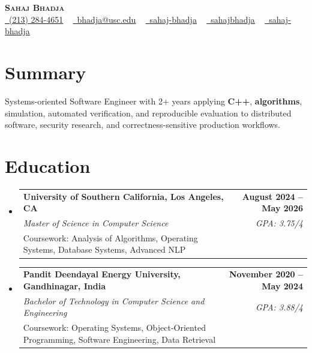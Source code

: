 \documentclass[letterpaper,10pt]{article}
\makeatletter
\newcommand{\sectionGap}{\vspace{-8pt}}
\newcommand{\resumeEduSubheading}[5]{\vspace{-1pt}\item\begin{tabular*}{1.0\textwidth}[t]{l@{\extracolsep{\fill}}r}\textbf{#1} & \textbf{\small #2} \\\textit{\small #3} & \textit{\small #4} \\\small #5 & \\\end{tabular*}\vspace{-4pt}}
\newcommand{\resumeSubHeadingListStart}{\begin{itemize}[leftmargin=0.0in, label={}]}
\newcommand{\resumeSubHeadingListEnd}{\end{itemize}}
\makeatother
\begin{document}
\begin{center}
{\Huge \scshape \textbf{Sahaj Bhadja}} \\ \vspace{1pt}
\small \href{tel:2132844651}{\faPhone\ \underline{(213) 284-4651}} ~ \href{mailto:bhadja@usc.edu}{\raisebox{-0.2\height}\faEnvelope\ \underline{bhadja@usc.edu}} ~
\href{https://www.linkedin.com/in/sahaj-bhadja/}{\raisebox{-0.2\height}\faLinkedin\ \underline{sahaj-bhadja}} ~ \href{https://github.com/SAHAJ-BHADJA}{\raisebox{-0.2\height}\faGithub\ \underline{sahajbhadja}} ~
\href{https://sahaj-bhadja.vercel.app/}{\raisebox{-0.2\height}\faGlobe\ \underline{sahaj-bhadja}}
\end{center}
\vspace{-16pt}
\section{Summary}
\begin{itemize}[leftmargin=0.15in, label={}]
\small{\item{Systems-oriented Software Engineer with 2+ years applying \textbf{C++}, \textbf{algorithms}, simulation, automated verification, and reproducible evaluation to distributed software, security research, and correctness-sensitive production workflows.}}
\end{itemize}
\sectionGap
\section{Education}
\resumeSubHeadingListStart
\resumeEduSubheading{University of Southern California, Los Angeles, CA}{August 2024 -- May 2026}{Master of Science in Computer Science}{GPA: 3.75/4}{Coursework: Analysis of Algorithms, Operating Systems, Database Systems, Advanced NLP}
\resumeEduSubheading{Pandit Deendayal Energy University, Gandhinagar, India}{November 2020 -- May 2024}{Bachelor of Technology in Computer Science and Engineering}{GPA: 3.88/4}{Coursework: Operating Systems, Object-Oriented Programming, Software Engineering, Data Retrieval}
\resumeSubHeadingListEnd
\sectionGap
\end{document}
